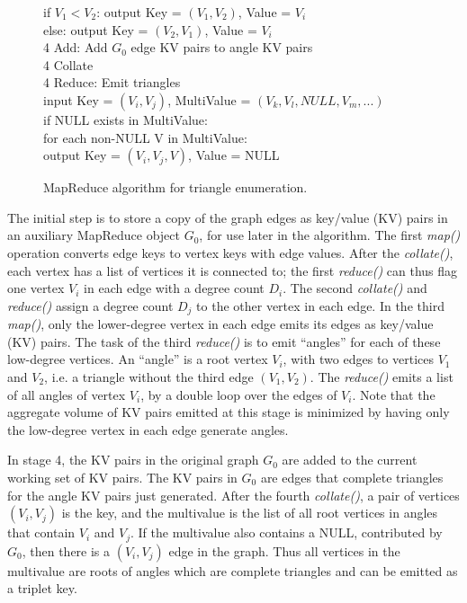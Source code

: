 \begin{figure}[htb]
\begin{center}
{\begin{minipage}{\textwidth}
\begin{tabbing}
	      \> \> \> \> if $V_1 < V_2$: output Key = $(V_1,V_2)$, Value = $V_i$ \\
	      \> \> \> \> else: output Key = $(V_2,V_1)$, Value = $V_i$ \\
4 Add: \> Add $G_0$ edge KV pairs to angle KV pairs \\
4 Collate \\
4 Reduce: \> Emit triangles \\
              \> \> input Key = $(V_i,V_j)$, MultiValue = $(V_k,V_l,NULL,V_m,...)$ \\
              \> \> if NULL exists in MultiValue: \\
	      \> \> \> for each non-NULL V in MultiValue: \\
	      \> \> \> \> output Key = $(V_i,V_j,V)$, Value = NULL

  \end{tabbing}
 \end{minipage}}\end{center}

 \caption{MapReduce algorithm for triangle enumeration.}

 \label{fig:tri}
\end{figure}

The initial step is to store a copy of the graph edges as key/value
(KV) pairs in an auxiliary MapReduce object $G_0$, for use later in the
algorithm.  The first {\it map()} operation converts edge keys to
vertex keys with edge values.  After the {\it collate()}, each vertex
has a list of vertices it is connected to; the first {\it reduce()}
can thus flag one vertex $V_i$ in each edge with a degree count $D_i$.
The second {\it collate()} and {\it reduce()} assign a degree count
$D_j$ to the other vertex in each edge.  In the third {\it map()},
only the lower-degree vertex in each edge emits its edges as key/value
(KV) pairs.  The task of the third {\it reduce()} is to emit
``angles'' for each of these low-degree vertices.  An ``angle'' is a
root vertex $V_i$, with two edges to vertices $V_1$ and $V_2$, i.e. a
triangle without the third edge $(V_1,V_2)$.  The {\it reduce()} emits
a list of all angles of vertex $V_i$, by a double loop over the edges
of $V_i$.  Note that the aggregate volume of KV pairs emitted at this
stage is minimized by having only the low-degree vertex in each edge
generate angles.

In stage 4, the KV pairs in the original graph $G_0$ are added to the
current working set of KV pairs.  The KV pairs in $G_0$ are edges that
complete triangles for the angle KV pairs just generated.  After the
fourth {\it collate()}, a pair of vertices $(V_i,V_j)$ is the key, and
the multivalue is the list of all root vertices in angles that contain
$V_i$ and $V_j$.  If the multivalue also contains a NULL, contributed
by $G_0$, then there is a $(V_i,V_j)$ edge in the graph.  Thus all
vertices in the multivalue are roots of angles which are complete
triangles and can be emitted as a triplet key.

